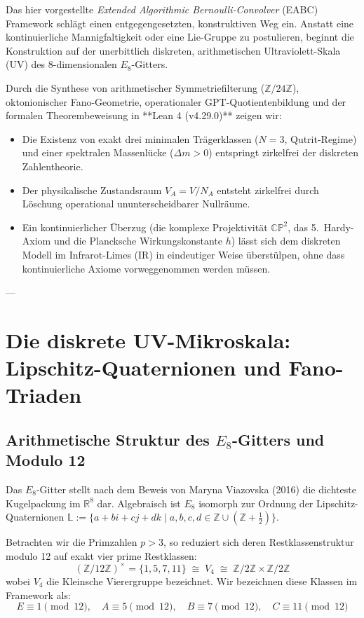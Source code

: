 \documentclass[11pt,a4paper]{article}
\begin{document}
Das hier vorgestellte \emph{Extended Algorithmic Bernoulli-Convolver} (EABC) Framework schlägt einen entgegengesetzten, konstruktiven Weg ein. Anstatt eine kontinuierliche Mannigfaltigkeit oder eine Lie-Gruppe zu postulieren, beginnt die Konstruktion auf der unerbittlich diskreten, arithmetischen Ultraviolett-Skala (UV) des 8-dimensionalen $E_8$-Gitters. 

Durch die Synthese von arithmetischer Symmetriefilterung ($\mathbb{Z}/24\mathbb{Z}$), oktonionischer Fano-Geometrie, operationaler GPT-Quotientenbildung und der formalen Theorembeweisung in **Lean 4 (v4.29.0)** zeigen wir:
\begin{itemize}
    \item Die Existenz von exakt drei minimalen Trägerklassen ($N=3$, Qutrit-Regime) und einer spektralen Massenlücke ($\Delta m > 0$) entspringt zirkelfrei der diskreten Zahlentheorie.
    \item Der physikalische Zustandsraum $V_A = V/N_A$ entsteht zirkelfrei durch Löschung operational ununterscheidbarer Nullräume.
    \item Ein kontinuierlicher Überzug (die komplexe Projektivität $\mathbb{CP}^2$, das 5.\ Hardy-Axiom und die Plancksche Wirkungskonstante $h$) lässt sich dem diskreten Modell im Infrarot-Limes (IR) in eindeutiger Weise überstülpen, ohne dass kontinuierliche Axiome vorweggenommen werden müssen.
\end{itemize}

---

\section{Die diskrete UV-Mikroskala: Lipschitz-Quaternionen und Fano-Triaden}

\subsection{Arithmetische Struktur des $E_8$-Gitters und Modulo 12}

Das $E_8$-Gitter stellt nach dem Beweis von Maryna Viazovska (2016) die dichteste Kugelpackung im $\mathbb{R}^8$ dar. Algebraisch ist $E_8$ isomorph zur Ordnung der Lipschitz-Quaternionen $\mathbb{L} := \{a + bi + cj + dk \mid a,b,c,d \in \mathbb{Z} \cup (\mathbb{Z} + \frac{1}{2})\}$.

Betrachten wir die Primzahlen $p > 3$, so reduziert sich deren Restklassenstruktur modulo 12 auf exakt vier prime Restklassen:
\begin{equation}
(\mathbb{Z}/12\mathbb{Z})^\times = \{1, 5, 7, 11\} \;\cong\; V_4 \;\cong\; \mathbb{Z}/2\mathbb{Z} \times \mathbb{Z}/2\mathbb{Z}
\end{equation}
wobei $V_4$ die Kleinsche Vierergruppe bezeichnet. Wir bezeichnen diese Klassen im Framework als:
\begin{equation}
E \equiv 1 \pmod{12}, \quad A \equiv 5 \pmod{12}, \quad B \equiv 7 \pmod{12}, \quad C \equiv 11 \pmod{12}
\end{equation}
\end{document}
